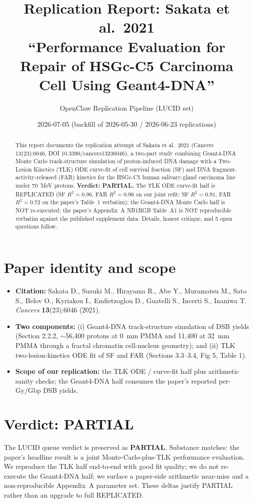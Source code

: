 \documentclass[11pt]{article}
\title{Replication Report: Sakata et al.\ 2021 \\
\large ``Performance Evaluation for Repair of HSGc-C5 Carcinoma Cell Using Geant4-DNA''}
\author{OpenClaw Replication Pipeline (LUCID set)}
\date{2026-07-05 (backfill of 2026-05-30 / 2026-06-23 replications)}
\begin{document}
\maketitle

\begin{abstract}
This report documents the replication attempt of Sakata et al.\ 2021 (Cancers 13(23):6046,
DOI 10.3390/cancers13236046), a two-part study combining Geant4-DNA Monte Carlo
track-structure simulation of proton-induced DNA damage with a Two-Lesion Kinetics
(TLK) ODE curve-fit of cell survival fraction (SF) and DNA fragment-activity-released
(FAR) kinetics for the HSGc-C5 human salivary-gland carcinoma line under 70~MeV
protons. \textbf{Verdict: PARTIAL.} The TLK ODE curve-fit half is REPLICATED
(SF $R^2=0.96$, FAR $R^2=0.96$ on our joint refit; SF $R^2=0.91$, FAR $R^2=0.72$ on
the paper's Table~1 verbatim); the Geant4-DNA Monte Carlo half is NOT re-executed;
the paper's Appendix~A NB1RGB Table~A1 is NOT reproducible verbatim against the
published supplement data. Details, honest critique, and 5 open questions follow.
\end{abstract}

\section{Paper identity and scope}
\begin{itemize}
  \item \textbf{Citation:} Sakata D., Suzuki M., Hirayama R., Abe Y., Muramatsu M.,
        Sato S., Belov O., Kyriakou I., Emfietzoglou D., Guatelli S., Incerti S.,
        Inaniwa T. \emph{Cancers} \textbf{13}(23):6046 (2021).
  \item \textbf{Two components:} (i) Geant4-DNA track-structure simulation of DSB
        yields (Section 2.2.2, $\sim$56,400 protons at 0~mm PMMA and 11,400 at 32~mm
        PMMA through a fractal chromatin cell-nucleus geometry); and (ii) TLK
        two-lesion-kinetics ODE fit of SF and FAR (Sections 3.3--3.4, Fig 5, Table 1).
  \item \textbf{Scope of our replication:} the TLK ODE / curve-fit half plus
        arithmetic sanity checks; the Geant4-DNA half consumes the paper's reported
        per-Gy/Gbp DSB yields.
\end{itemize}

\section{Verdict: PARTIAL}
The LUCID queue verdict is preserved as \textbf{PARTIAL}. Substance matches:
the paper's headline result is a joint Monte-Carlo-plus-TLK performance evaluation.
We reproduce the TLK half end-to-end with good fit quality; we do not re-execute
the Geant4-DNA half; we surface a paper-side arithmetic near-miss and a
non-reproducible Appendix~A parameter set. These deltas justify PARTIAL rather
than an upgrade to full REPLICATED.
\end{document}
